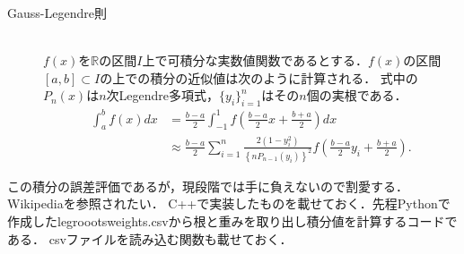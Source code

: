 \documentclass[a4j,papersize,disablejfam,slide,14pt]{jsarticle}
\begin{document}
    \begin{screen}
    \begin{description}
    	\item[{\rm Gauss-Legendre}則]\mbox{}\\
        $f(x)$を$\mathbb{R}$の区間$I$上で可積分な実数値関数であるとする．$f(x)$の区間$[a,b] \subset I$の上での積分の近似値は次のように計算される．
        式中の$P_n(x)$は$n$次{\rm Legendre}多項式，$\{y_i\}_{i=1}^{n}$はその$n$個の実根である．
    		\begin{align}
    			\int_{a}^{b} f(x) dx &= \frac{b-a}{2} \int_{-1}^{1} f\left( \frac{b-a}{2}x + \frac{b+a}{2} \right) dx \\
        		&\approx \frac{b-a}{2} \sum_{i=1}^{n} \frac{2(1-y_i^2)}{ \left\{nP_{n-1}(y_i) \right\}^2} f\left( \frac{b-a}{2}y_i + \frac{b+a}{2} \right).
    		\end{align}
    \end{description}
    \end{screen}
    この積分の誤差評価であるが，現段階では手に負えないので割愛する．{\rm Wikipedia}を参照されたい．
    {\rm C++}で実装したものを載せておく．先程{\rm Python}で作成した{\rm legroootsweights.csv}から根と重みを取り出し積分値を計算するコードである．
    {\rm csv}ファイルを読み込む関数も載せておく．
\end{document}

